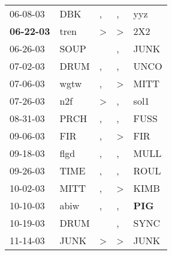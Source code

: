 \begin{supertabular}{p{0.07\textwidth}p{0.06\textwidth}p{0.02\textwidth}p{0.02\textwidth}p{0.06\textwidth}}
          06-08-03\textsuperscript{} &            DBK\textsuperscript{} &                , &                , &            yyz\textsuperscript{} \\
 \textbf{06-22-03\textsuperscript{}} &           tren\textsuperscript{} &     \textgreater &     \textgreater &            2X2\textsuperscript{} \\
          06-26-03\textsuperscript{} &           SOUP\textsuperscript{} &                  &                , &           JUNK\textsuperscript{} \\
          07-02-03\textsuperscript{} &           DRUM\textsuperscript{} &                , &                , &           UNCO\textsuperscript{} \\
          07-06-03\textsuperscript{} &           wgtw\textsuperscript{} &                , &     \textgreater &           MITT\textsuperscript{} \\
          07-26-03\textsuperscript{} &            n2f\textsuperscript{} &     \textgreater &                , &           sol1\textsuperscript{} \\
          08-31-03\textsuperscript{} &           PRCH\textsuperscript{} &                , &                , &           FUSS\textsuperscript{} \\
          09-06-03\textsuperscript{} &            FIR\textsuperscript{} &                , &     \textgreater &            FIR\textsuperscript{} \\
          09-18-03\textsuperscript{} &           flgd\textsuperscript{} &                , &                , &           MULL\textsuperscript{} \\
          09-26-03\textsuperscript{} &           TIME\textsuperscript{} &                , &                , &           ROUL\textsuperscript{} \\
          10-02-03\textsuperscript{} &           MITT\textsuperscript{} &                , &     \textgreater &           KIMB\textsuperscript{} \\
          10-10-03\textsuperscript{} &           abiw\textsuperscript{} &                , &                , &   \textbf{PIG\textsuperscript{}} \\
          10-19-03\textsuperscript{} &           DRUM\textsuperscript{} &                  &                , &           SYNC\textsuperscript{} \\
          11-14-03\textsuperscript{} &           JUNK\textsuperscript{} &     \textgreater &     \textgreater &           JUNK\textsuperscript{} \\

\end{supertabular}
